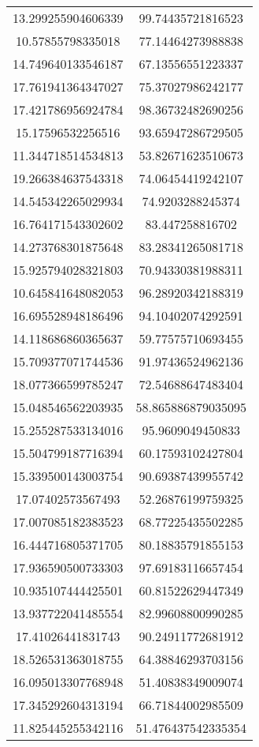 \begin{table}
\begin{tabular}{cc}
13.299255904606339 & 99.74435721816523 \\
10.57855798335018 & 77.14464273988838 \\
14.749640133546187 & 67.13556551223337 \\
17.761941364347027 & 75.37027986242177 \\
17.421786956924784 & 98.36732482690256 \\
15.17596532256516 & 93.65947286729505 \\
11.344718514534813 & 53.82671623510673 \\
19.266384637543318 & 74.06454419242107 \\
14.545342265029934 & 74.9203288245374 \\
16.764171543302602 & 83.447258816702 \\
14.273768301875648 & 83.28341265081718 \\
15.925794028321803 & 70.94330381988311 \\
10.645841648082053 & 96.28920342188319 \\
16.695528948186496 & 94.10402074292591 \\
14.118686860365637 & 59.77575710693455 \\
15.709377071744536 & 91.97436524962136 \\
18.077366599785247 & 72.54688647483404 \\
15.048546562203935 & 58.865886879035095 \\
15.255287533134016 & 95.9609049450833 \\
15.504799187716394 & 60.17593102427804 \\
15.339500143003754 & 90.69387439955742 \\
17.07402573567493 & 52.26876199759325 \\
17.007085182383523 & 68.77225435502285 \\
16.444716805371705 & 80.18835791855153 \\
17.936590500733303 & 97.69183116657454 \\
10.935107444425501 & 60.81522629447349 \\
13.937722041485554 & 82.99608800990285 \\
17.41026441831743 & 90.24911772681912 \\
18.526531363018755 & 64.38846293703156 \\
16.095013307768948 & 51.40838349009074 \\
17.345292604313194 & 66.71844002985509 \\
11.825445255342116 & 51.476437542335354 \\

\end{tabular}
\end{table}
